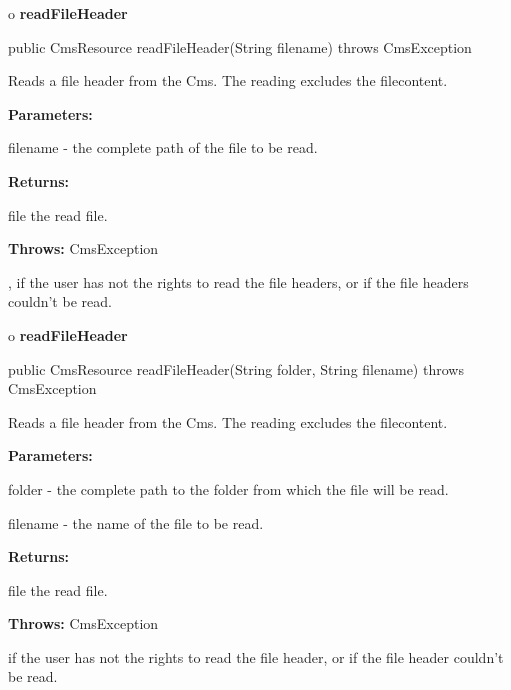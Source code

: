 o {\bf readFileHeader} 

\begin{PRE}
 public CmsResource readFileHeader(String filename) throws CmsException
\end{PRE}

\begin{description}
\htmlDD Reads a file header from the Cms. \htmlBR
The reading excludes the filecontent. 

\begin{description}
\item {\bf Parameters:}  

filename - the complete path of the file to be read.  
\item {\bf Returns:}  

file the read file.  
\item {\bf Throws:} CmsException  

, if the user has not the rights to read the file headers, or if the file
headers couldn't be read.  
\end{description}

\end{description}

o {\bf readFileHeader} 

\begin{PRE}
 public CmsResource readFileHeader(String folder,
                                   String filename) throws CmsException
\end{PRE}

\begin{description}
\htmlDD Reads a file header from the Cms. \htmlBR
The reading excludes the filecontent. 

\begin{description}
\item {\bf Parameters:}  

folder - the complete path to the folder from which the file will be read.  

filename - the name of the file to be read.  
\item {\bf Returns:}  

file the read file.  
\item {\bf Throws:} CmsException  

if the user has not the rights to read the file header, or if the file header
couldn't be read.  
\end{description}

\end{description}

